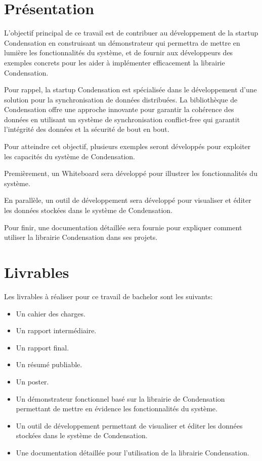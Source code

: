 \section*{Présentation}
L'objectif principal de ce travail est de contribuer au développement de la startup Condensation en construisant un démonstrateur qui permettra de mettre en lumière les fonctionnalités du système, et de fournir aux développeurs des exemples concrets pour les aider à implémenter efficacement la librairie Condensation.

Pour rappel, la startup Condensation est spécialisée dans le développement d'une solution pour la synchronisation de données distribuées. La bibliothèque de Condensation offre une approche innovante pour garantir la cohérence des données en utilisant un système de synchronisation conflict-free qui garantit l'intégrité des données et la sécurité de bout en bout.

Pour atteindre cet objectif, plusieurs exemples seront développés pour exploiter les capacités du système de Condensation. 

Premièrement, un Whiteboard sera développé pour illustrer les fonctionnalités du système. 

En parallèle, un outil de développement sera développé pour visualiser et éditer les données stockées dans le système de Condensation.

Pour finir, une documentation détaillée sera fournie pour expliquer comment utiliser la librairie Condensation dans ses projets.

\section*{Livrables}
Les livrables à réaliser pour ce travail de bachelor sont les suivants:

\begin{itemize}
    \item Un cahier des charges.
    \item Un rapport intermédiaire.
    \item Un rapport final.
    \item Un résumé publiable.
    \item Un poster.
    \item Un démonstrateur fonctionnel basé sur la librairie de Condensation permettant de mettre en évidence les fonctionnalités du système.
    \item Un outil de développement permettant de visualiser et éditer les données stockées dans le système de Condensation.
    \item Une documentation détaillée pour l'utilisation de la librairie Condensation.
\end{itemize}

